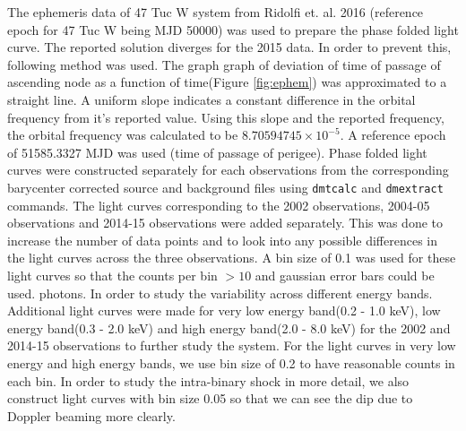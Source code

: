 \documentclass[a4paper,fleqn,usenatbib]{mnras}
\begin{document}
The ephemeris data of 47 Tuc W system from Ridolfi et. al. 2016 (reference epoch for 47 Tuc W being MJD 50000) was used to prepare the phase folded light curve. The reported solution diverges for the 2015 data. In order to prevent this, following method was used. The graph graph of deviation of time of passage of ascending node as a function of time(Figure \ref{fig:ephem}) was approximated to a straight line. A uniform slope indicates a constant difference in the orbital frequency from it's reported value. Using this slope and the reported frequency,  the orbital frequency was calculated to be $8.70594745 \times 10^{-5}$. A
reference epoch of 51585.3327 MJD was used (time of passage of perigee). Phase folded light curves were constructed separately for
each observations from the corresponding barycenter corrected source and background files using \texttt{dmtcalc} and \texttt{dmextract}
commands. The light curves corresponding to the 2002 observations, 2004-05 observations and 2014-15 observations were added separately.
This was done to increase the number of data points and to look into any possible differences in the light curves across the three
observations. A bin size of 0.1 was used for these light curves so that the counts per bin $>10$ and gaussian error bars could be used. 
photons. In order to study the variability across different energy bands. Additional light curves were made for very low energy 
band(0.2 - 1.0 keV), low energy band(0.3 - 2.0 keV) and high energy band(2.0 - 8.0 keV) for the 2002 and 2014-15 observations 
to further study the system. For the light curves in very low energy and high energy bands, we use bin size of 0.2 to have reasonable counts in each bin.  In order to study the intra-binary shock in more detail, we also construct light curves with bin size 0.05 so that we can see the dip due to Doppler beaming more clearly.
\end{document}
